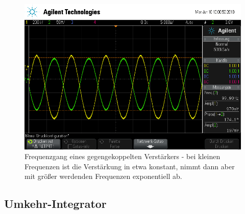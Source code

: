 \begin{figure}[h]
	\centering
	\includegraphics[width=\textwidth]{usb/scope_234.png}
	\caption{Frequenzgang eines gegengekoppelten Verstärkers - bei kleinen Frequenzen ist die Verstärkung in etwa konstant, nimmt dann aber mit größer werdenden Frequenzen exponentiell ab.}
	\label{scope_234}
\end{figure}

\FloatBarrier

\subsection{Umkehr-Integrator}

